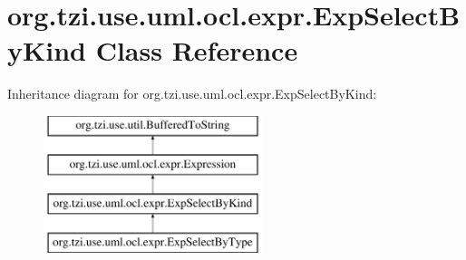 \hypertarget{classorg_1_1tzi_1_1use_1_1uml_1_1ocl_1_1expr_1_1_exp_select_by_kind}{\section{org.\-tzi.\-use.\-uml.\-ocl.\-expr.\-Exp\-Select\-By\-Kind Class Reference}
\label{classorg_1_1tzi_1_1use_1_1uml_1_1ocl_1_1expr_1_1_exp_select_by_kind}
}
Inheritance diagram for org.\-tzi.\-use.\-uml.\-ocl.\-expr.\-Exp\-Select\-By\-Kind\-:\begin{figure}[H]
\begin{center}
\leavevmode
\includegraphics[height=4.000000cm]{classorg_1_1tzi_1_1use_1_1uml_1_1ocl_1_1expr_1_1_exp_select_by_kind}
\end{center}
\end{figure}
